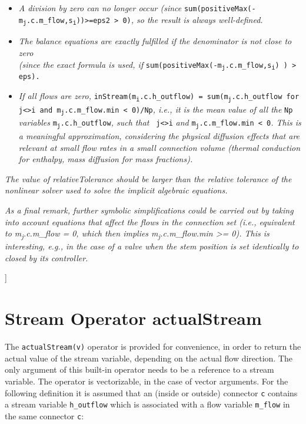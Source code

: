 \begin{itemize}
\item
  \emph{A division by zero can no longer occur (since} \texttt{sum(positiveMax(-m\textsubscript{j}.c.m\_flow,s\textsubscript{i}))\textgreater{}=eps2
  \textgreater{} 0)}\emph{, so the result is always well-defined.}
\item
  \emph{The balance equations are exactly fulfilled if the denominator
  is not close to zero\\
  (since the exact formula is used, if}
  \texttt{sum(positiveMax(-m\textsubscript{j}.c.m\_flow,s\textsubscript{i})
  ) \textgreater{} eps).}
\item
  \emph{If all flows are zero,}
  \texttt{inStream(m\textsubscript{i}.c.h\_outflow) =
  sum(m\textsubscript{j}.c.h\_outflow for
  j\textless{}\textgreater{}i and m\textsubscript{j}.c.m\_flow.min \textless{}
  0)/Np}\emph{, i.e., it is the mean value of all the} \lstinline!Np! \emph{variables}
  \texttt{m\textsubscript{j}.c.h\_outflow}\emph{, such that} \texttt{
  j\textless{}\textgreater{}i} \emph{and}
  \texttt{m\textsubscript{j}.c.m\_flow.min \textless{} 0}\emph{. This is a
  meaningful approximation, considering the physical diffusion effects
  that are relevant at small flow rates in a small connection volume
  (thermal conduction for enthalpy, mass diffusion for mass fractions).}
\end{itemize}

\emph{The value of relativeTolerance should be larger than the relative
tolerance of the nonlinear solver used to solve the implicit algebraic
equations.}

\emph{As a final remark, further symbolic simplifications could be
carried out by taking into account equations that affect the flows in
the connection set (i.e., equivalent to m\textsubscript{j}.c.m\_flow =
0, which then implies m\textsubscript{j}.c.m\_flow.min \textgreater{}=
0). This is interesting, e.g., in the case of a valve when the stem
position is set identically to closed by its controller.}

{]}

\section{Stream Operator actualStream}

The \lstinline!actualStream(v)! operator is provided for convenience, in
order to return the actual value of the stream variable, depending on
the actual flow direction. The only argument of this built-in operator
needs to be a reference to a stream variable. The operator is
vectorizable, in the case of vector arguments. For the following
definition it is assumed that an (inside or outside) connector \lstinline!c!
contains a stream variable \lstinline!h_outflow! which is associated with a flow
variable \lstinline!m_flow! in the same connector \lstinline!c!:

